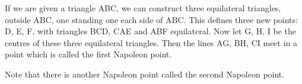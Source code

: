 If we are given a triangle ABC, we can construct three equilateral triangles,
outside ABC, one standing one each side of ABC. This defines three new points: 
D, E, F, with triangles BCD, CAE and ABF equilateral. Now let G, H, I be the
 centres of these three equilateral triangles. Then the lines AG, BH, CI meet
in a point which is called the first Napoleon point.
\par
Note that there is another Napoleon point called the second Napoleon point.
